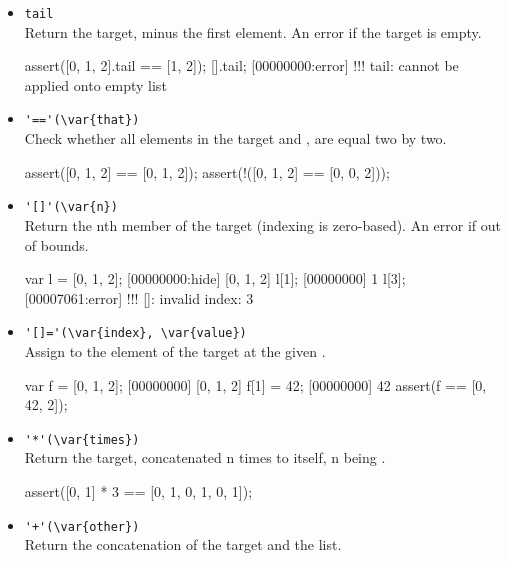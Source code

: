 \begin{itemize}
\item \lstinline|tail|\\
Return the target, minus the first element. An error if the target is
empty.

\begin{urbiscript}[firstnumber=last]
assert([0, 1, 2].tail == [1, 2]);
[].tail;
[00000000:error] !!! tail: cannot be applied onto empty list
\end{urbiscript}

\item \lstinline|'=='(\var{that})|\\
Check whether all elements in the target and , are
equal two by two.

\begin{urbiscript}[firstnumber=last]
assert([0, 1, 2] == [0, 1, 2]);
assert(!([0, 1, 2] == [0, 0, 2]));
\end{urbiscript}

\item \lstinline|'[]'(\var{n})|\\
  Return the nth member of the target (indexing is zero-based). An
  error if out of bounds.

\begin{urbiscript}[firstnumber=last]
var l = [0, 1, 2];
[00000000:hide] [0, 1, 2]
l[1];
[00000000] 1
l[3];
[00007061:error] !!! []: invalid index: 3
\end{urbiscript}

\item \lstinline|'[]='(\var{index}, \var{value})|\\
  Assign  to the element of the target at the given
  .

\begin{urbiscript}[firstnumber=last]
var f = [0, 1, 2];
[00000000] [0, 1, 2]
f[1] = 42;
[00000000] 42
assert(f == [0, 42, 2]);
\end{urbiscript}

\item \lstinline|'*'(\var{times})|\\
Return the target, concatenated n times to itself, n being .

\begin{urbiscript}[firstnumber=last]
assert([0, 1] * 3 == [0, 1, 0, 1, 0, 1]);
\end{urbiscript}

\item \lstinline|'+'(\var{other})|\\
Return the concatenation of the target and the  list.


\end{itemize}

